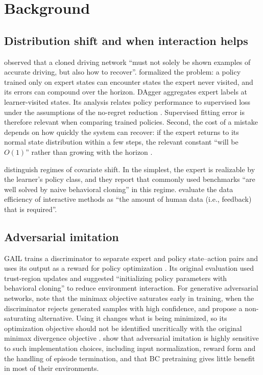 \documentclass[conference]{IEEEtran}
\begin{document}
\section{Background}

\subsection{Distribution shift and when interaction helps}
\citet{pomerleau1989} observed that a cloned driving network ``must not solely be shown examples of accurate driving, but also how to recover''. \citet{ross2011} formalized the problem: a policy trained only on expert states can encounter states the expert never visited, and its errors can compound over the horizon. DAgger aggregates expert labels at learner-visited states. Its analysis relates policy performance to supervised loss under the assumptions of the no-regret reduction \citep{ross2011}. Supervised fitting error is therefore relevant when comparing trained policies. Second, the cost of a mistake depends on how quickly the system can recover: if the expert returns to its normal state distribution within a few steps, the relevant constant ``will be $O(1)$'' rather than growing with the horizon \citep[\S2.2]{ross2011}.

\citet{spencer2021} distinguish regimes of covariate shift. In the simplest, the expert is realizable by the learner's policy class, and they report that commonly used benchmarks ``are well solved by naive behavioral cloning'' in this regime. \citet{celemin2022} evaluate the data efficiency of interactive methods as ``the amount of human data (i.e., feedback) that is required''.

\subsection{Adversarial imitation}
GAIL trains a discriminator to separate expert and policy state--action pairs and uses its output as a reward for policy optimization \citep{ho2016}. Its original evaluation used trust-region updates and suggested ``initializing policy parameters with behavioral cloning'' to reduce environment interaction. For generative adversarial networks, \citet{goodfellow2014} note that the minimax objective saturates early in training, when the discriminator rejects generated samples with high confidence, and propose a non-saturating alternative. Using it changes what is being minimized, so its optimization objective should not be identified uncritically with the original minimax divergence objective \citep{jolicoeur2018}. \citet{orsini2021} show that adversarial imitation is highly sensitive to such implementation choices, including input normalization, reward form and the handling of episode termination, and that BC pretraining gives little benefit in most of their environments.
\end{document}
